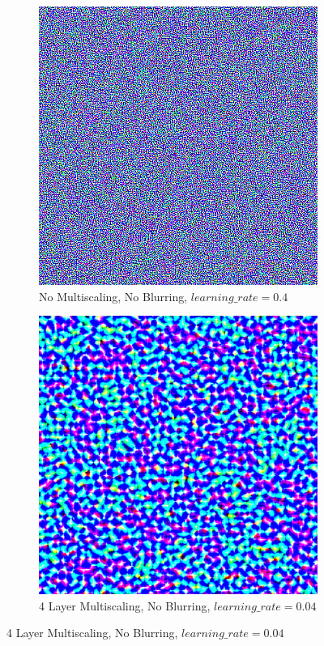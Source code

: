 \begin{figure}
    \captionsetup{justification=centering}

    \begin{subfigure}[t]{0.31\textwidth}
        \captionsetup{justification=centering}
        \centering
        \includegraphics[width=.7\linewidth]{figuras/feat_vis/experiments/initial/l1/random_image_pl1_lr4e-1_layer0_no-blur.png}
        \caption{No Multiscaling, No Blurring, \(learning\_rate = 0.4\)}
    \end{subfigure}
    \hfill
    \begin{subfigure}[t]{0.31\textwidth}
        \captionsetup{justification=centering}
        \centering
        \includegraphics[width=.7\linewidth]{figuras/feat_vis/experiments/initial/l1/random_image_pl4_lr4e-2_layer0_no-blur.png}
        \caption{4 Layer Multiscaling, No Blurring, \(learning\_rate = 0.04\)}

\end{subfigure}
\end{figure}

